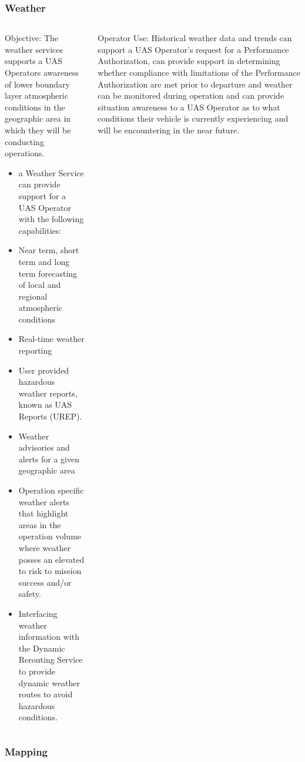 \documentclass[usenames,dvipsnames,aspectratio=169,serif]{beamer}
\begin{document}
\begin{frame}
   \frametitle{Weather}
   \begin{columns}[t]
      \begin{column}{0.5\textwidth}
         Objective: The weather services supports a UAS Operators awareness of lower boundary layer atmospheric conditions in the geographic area in which they will be conducting operations.
         \begin{itemize}
         \item  a Weather Service can provide support for a UAS Operator with the following capabilities:
         \item  Near term, short term and long term forecasting of local and regional atmospheric conditions
         \item  Real-time weather reporting
         \item  User provided hazardous weather reports, known as UAS Reports (UREP).
         \item  Weather advisories and alerts for a given geographic area
         \item  Operation specific weather alerts that highlight areas in the operation volume where weather posses an elevated to risk to mission success and/or safety.
         \item  Interfacing weather information with the Dynamic Rerouting Service to provide dynamic weather routes to avoid hazardous conditions.
         \end{itemize}
      \end{column}
      \begin{column}{0.5\textwidth}
         Operator Use:
         Historical weather data and trends can support a UAS Operator's request for a Performance Authorization, can provide support in determining whether compliance with limitations of the Performance Authorization are met prior to departure and weather can be monitored during operation and can provide situation awareness to a UAS Operator as to what conditions their vehicle is currently experiencing and will be encountering in the near future.
      \end{column}
   \end{columns}
\end{frame}

\begin{frame}
   \frametitle{Mapping}
   \begin{columns}[t]
      \begin{column}{0.5\textwidth}
      \end{column}
      \begin{column}{0.5\textwidth}
      \end{column}
   \end{columns}
\end{frame}
\end{document}
